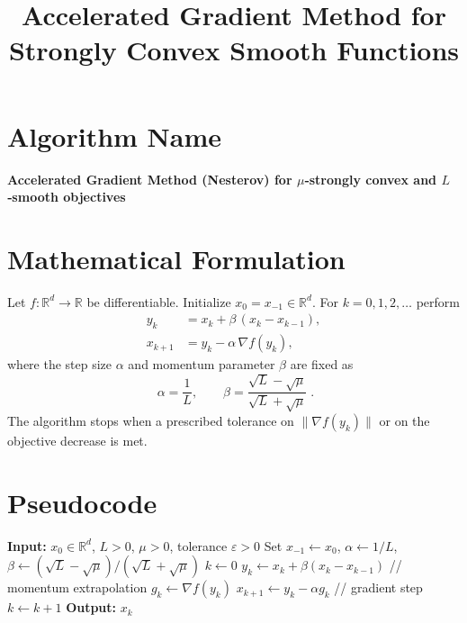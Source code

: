 \documentclass{article}
\begin{document}
\title{Accelerated Gradient Method for Strongly Convex Smooth Functions}
\author{}
\date{}
\maketitle

\section*{Algorithm Name}
\textbf{Accelerated Gradient Method (Nesterov) for $\mu$‑strongly convex and $L$‑smooth objectives}
\section*{Mathematical Formulation}
Let $f:\mathbb{R}^{d}\rightarrow\mathbb{R}$ be differentiable.  
Initialize $x_{0}=x_{-1}\in\mathbb{R}^{d}$.  
For $k=0,1,2,\dots$ perform
\begin{subequations}\label{eq:alg}
\begin{align}
y_{k} &= x_{k}+ \beta\,(x_{k}-x_{k-1}), \tag{1}\\
x_{k+1} &= y_{k}-\alpha \,\nabla f(y_{k}), \tag{2}
\end{align}
\end{subequations}
where the step size $\alpha$ and momentum parameter $\beta$ are fixed as
\[
\boxed{\;\alpha = \frac{1}{L},\qquad
\beta = \frac{\sqrt{L}-\sqrt{\mu}}{\sqrt{L}+\sqrt{\mu}}\; } .
\]
The algorithm stops when a prescribed tolerance on $\|\nabla f(y_{k})\|$ or on the objective decrease is met.

\section*{Pseudocode}
\begin{algorithm}[H]
\caption{Accelerated Gradient for Strongly Convex $f$}
\begin{algorithmic}[1]
\State \textbf{Input:} $x_{0}\in\mathbb{R}^{d}$, $L>0$, $\mu>0$, tolerance $\varepsilon>0$
\State Set $x_{-1}\gets x_{0}$, $\alpha\gets 1/L$, $\beta\gets (\sqrt{L}-\sqrt{\mu})/(\sqrt{L}+\sqrt{\mu})$
\State $k\gets 0$
    \State $y_{k}\gets x_{k}+ \beta (x_{k}-x_{k-1})$ \hfill // momentum extrapolation
    \State $g_{k}\gets \nabla f(y_{k})$
    \State $x_{k+1}\gets y_{k}-\alpha g_{k}$ \hfill // gradient step
    \State $k\gets k+1$
\EndWhile
\State \textbf{Output:} $x_{k}$
\end{algorithmic}
\end{algorithm}
\end{document}
